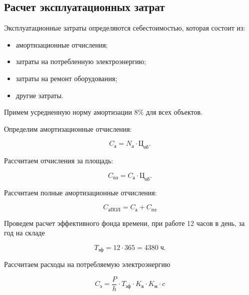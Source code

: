     \subsection{Расчет эксплуатационных затрат}

        Эксплуатационные затраты определяются себестоимостью, которая состоит
        из:
        \begin{itemize}
            \item амортизационные отчисления;
            \item затраты на потребленную электроэнергию;
            \item затраты на ремонт оборудования;
            \item другие затраты.
        \end{itemize}

        Примем усредненную норму амортизации 8\% для всех объектов.

        Определим амортизационные отчисления:

        \begin{equation}
            C_\text{а} = N_\text{а} \cdot \text{Ц}_\text{об}.
        \end{equation}

        Рассчитаем отчисления за площадь:

        \begin{equation}
            C_\text{пл} = C_\text{а} \cdot \text{Ц}_\text{об}.
        \end{equation}

        Рассчитаем полные амортизационные отчисления:

        \begin{equation}
            C_\text{аПОЛ}  = C_\text{а} + C_\text{пл} 
        \end{equation}

        Проведем расчет эффективного фонда времени, при работе 12 часов в
        день, за год на складе

        \begin{equation}
            T_\text{эф} = 12 \cdot 365 = 4380 \; \text{ч}. 
        \end{equation}

        Рассчитаем расходы на потребляемую электроэнергию

        \begin{equation}
            C_\text{э} = \frac{P}{h} \cdot
                T_\text{эф} \cdot K_\text{в} \cdot K_\text{м} \cdot c 
        \end{equation}

